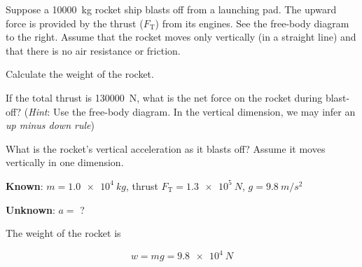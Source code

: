 \documentclass{exam}
\begin{document}
\begin{questions}
\begin{EnvUplevel}
\begin{minipage}{0.6\textwidth}
Suppose a \SI{10000}{kg} rocket ship blasts off from a launching pad. The upward force is provided by the thrust ($F_{\text{T}}$) from its engines. See the free-body diagram to the right. Assume that the rocket moves only vertically (in a straight line) and that there is no air resistance or friction.
\end{minipage}%
\hspace{-2cm}
\begin{minipage}{0.5\textwidth}
\centering
\end{minipage}

\end{EnvUplevel}

\question
Calculate the weight of the rocket.

\question
If the total thrust is \SI{130000}{N}, what is the net force on the rocket during blast-off?
(\textit{Hint}: Use the free-body diagram. In the vertical dimension, we may infer an \textit{up minus down rule})

\question
What is the rocket's vertical acceleration as it blasts off? Assume it moves vertically in one dimension.

\begin{solution}
\vspace{1em}

\textbf{Known}: $m = \SI{1.0e4}{kg}$, thrust $F_{\text{T}} = \SI{1.3e5}{N}$, $g = \SI{9.8}{m/s^2}$

\textbf{Unknown}: $a =$ ?

\begin{center}
\end{center}

The weight of the rocket is 

\begin{equation*}
    w = m g = \SI{9.8e4}{N}
\end{equation*}


\end{solution}
\end{questions}
\end{document}
